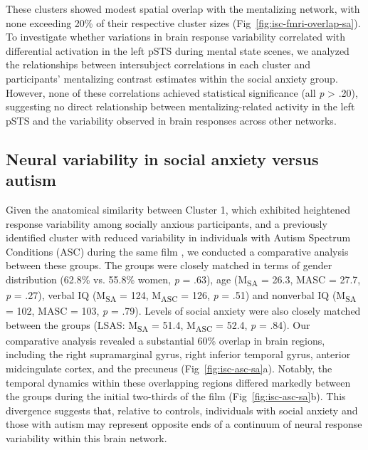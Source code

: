 

These clusters showed modest spatial overlap with the mentalizing network, with none exceeding 20\% of their respective cluster sizes (Fig~\ref{fig:isc-fmri-overlap-sa}). To investigate whether variations in brain response variability correlated with differential activation in the left pSTS during mental state scenes, we analyzed the relationships between intersubject correlations in each cluster and participants' mentalizing contrast estimates within the social anxiety group. However, none of these correlations achieved statistical significance (all \textit{p} > .20), suggesting no direct relationship between mentalizing-related activity in the left pSTS and the variability observed in brain responses across other networks. 



\subsection{Neural variability in social anxiety versus autism}
Given the anatomical similarity between Cluster 1, which exhibited heightened response variability among socially anxious participants, and a previously identified cluster with reduced variability in individuals with Autism Spectrum Conditions (ASC) during the same film \citep{mangnus2024bpcnni}, we conducted a comparative analysis between these groups. The groups were closely matched in terms of gender distribution (62.8\% vs. 55.8\% women, \textit{p} = .63), age (M\textsubscript{SA} = 26.3, MASC = 27.7, \textit{p} = .27), verbal IQ (M\textsubscript{SA} = 124, M\textsubscript{ASC} = 126, \textit{p} = .51) and nonverbal IQ (M\textsubscript{SA} = 102, MASC = 103, \textit{p} = .79). Levels of social anxiety were also closely matched between the groups (LSAS: M\textsubscript{SA} = 51.4, M\textsubscript{ASC} = 52.4, \textit{p} = .84). Our comparative analysis revealed a substantial 60\% overlap in brain regions, including the right supramarginal gyrus, right inferior temporal gyrus, anterior midcingulate cortex, and the precuneus (Fig~\ref{fig:isc-asc-sa}a). Notably, the temporal dynamics within these overlapping regions differed markedly between the groups during the initial two-thirds of the film (Fig~\ref{fig:isc-asc-sa}b). This divergence suggests that, relative to controls, individuals with social anxiety and those with autism may represent opposite ends of a continuum of neural response variability within this brain network.

